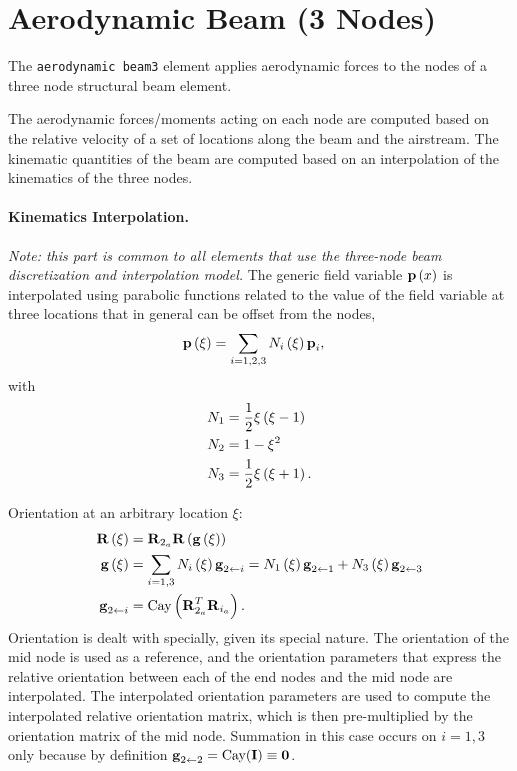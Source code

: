 \section{Aerodynamic Beam (3 Nodes)}
The \texttt{aerodynamic beam3} element applies aerodynamic forces
to the nodes of a three node structural beam element. 

The aerodynamic forces/moments acting on each node 
are computed based on the relative velocity of a set of locations
along the beam and the airstream.
The kinematic quantities of the beam are computed based
on an interpolation of the kinematics of the three nodes.

\paragraph{Kinematics Interpolation.}
\emph{Note: this part is common to all elements that use the
three-node beam discretization and interpolation model.}
The generic field variable $\bm{\mathbf{p}}\left( x \right)$ is interpolated
using parabolic functions related to the value of the field 
variable at three locations that in general can be offset
from the nodes,
\begin{align}
	\bm{\mathbf{p}}\left( \xi \right)
	&=
	\sum_{i=1,2,3} N_i\left( \xi \right) \bm{\mathbf{p}}_i
	,
\end{align}
with
\begin{subequations}
\begin{align}
	N_1 &= \frac{1}{2} \xi \left( \xi - 1 \right)
	\\
	N_2 &= 1 - \xi^2
	\\
	N_3 &= \frac{1}{2} \xi \left( \xi + 1 \right)
	.
\end{align}
\end{subequations}

Orientation at an arbitrary location $\xi$:
\begin{align}
	\bm{\mathbf{R}}\left( \xi \right)
	&=
	\bm{\mathbf{R}}_{2_a} \bm{\mathbf{R}}\left( \bm{\mathbf{g}}\left( \xi \right) \right)
	\\
	\bm{\mathbf{g}}\left( \xi \right)
	&=
	\sum_{i=1,3} N_i\left( \xi \right) \bm{\mathbf{g}}_{2\leftarrow i}
	= N_1\left( \xi \right) \bm{\mathbf{g}}_{2\leftarrow 1} + N_3\left( \xi \right) \bm{\mathbf{g}}_{2\leftarrow 3}
	\\
	\bm{\mathbf{g}}_{2\leftarrow i}
	&=
	\text{Cay}\left( \bm{\mathbf{R}}_{2_a}^T \bm{\mathbf{R}}_{i_a} \right)
	.
\end{align}
Orientation is dealt with specially, given its special nature.
The orientation of the mid node is used as a reference,
and the orientation parameters that express the relative orientation
between each of the end nodes and the mid node are interpolated.
The interpolated orientation parameters are used to compute
the interpolated relative orientation matrix, which is then
pre-multiplied by the orientation matrix of the mid node.
Summation in this case occurs on $i=1,3$ only because by definition
$\bm{\mathbf{g}}_{2\leftarrow 2}=\text{Cay}(\bm{\mathbf{I}})\equiv\bm{\mathbf{0}}$.

